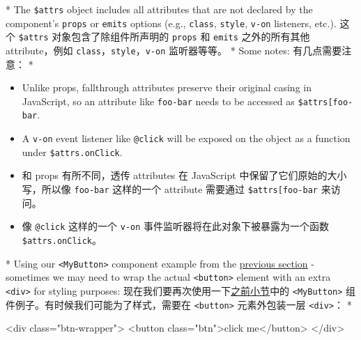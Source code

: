 \begin{paracol}{2}
\switchcolumn[0]*%
The \texttt{\$attrs} object includes all attributes that are not
declared by the component's \texttt{props} or \texttt{emits} options
(e.g., \texttt{class}, \texttt{style}, \texttt{v-on} listeners, etc.).
\switchcolumn
这个 \texttt{\$attrs} 对象包含了除组件所声明的 \texttt{props} 和
\texttt{emits} 之外的所有其他 attribute，例如
\texttt{class}，\texttt{style}，\texttt{v-on} 监听器等等。
\switchcolumn[0]*%
Some notes:
\switchcolumn
有几点需要注意：
\switchcolumn[0]*%
\begin{itemize}
\item
  Unlike props, fallthrough attributes preserve their original casing in
  JavaScript, so an attribute like \texttt{foo-bar} needs to be accessed
  as \texttt{\$attrs{[}\textquotesingle{}foo-bar\textquotesingle{}{]}}.
\item
  A \texttt{v-on} event listener like \texttt{@click} will be exposed on
  the object as a function under \texttt{\$attrs.onClick}.
\end{itemize}
\switchcolumn
\begin{itemize}
\item
  和 props 有所不同，透传 attributes 在 JavaScript
  中保留了它们原始的大小写，所以像 \texttt{foo-bar} 这样的一个 attribute
  需要通过
  \texttt{\$attrs{[}\textquotesingle{}foo-bar\textquotesingle{}{]}}
  来访问。
\item
  像 \texttt{@click} 这样的一个 \texttt{v-on}
  事件监听器将在此对象下被暴露为一个函数 \texttt{\$attrs.onClick}。
\end{itemize}
\switchcolumn[0]*%
Using our \texttt{\textless{}MyButton\textgreater{}} component example
from the
\href{https://vuejs.org/guide/components/attrs.html\#attribute-inheritance}{previous
section} - sometimes we may need to wrap the actual
\texttt{\textless{}button\textgreater{}} element with an extra
\texttt{\textless{}div\textgreater{}} for styling purposes:
\switchcolumn
现在我们要再次使用一下\href{https://cn.vuejs.org/guide/components/attrs.html\#attribute-inheritance}{之前小节}中的
\texttt{\textless{}MyButton\textgreater{}}
组件例子。有时候我们可能为了样式，需要在
\texttt{\textless{}button\textgreater{}} 元素外包装一层
\texttt{\textless{}div\textgreater{}}：
\switchcolumn[0]*%
\begin{codeHtml}
<div class="btn-wrapper">
  <button class="btn">click me</button>
</div>
\end{codeHtml}
\switchcolumn

\end{paracol}
